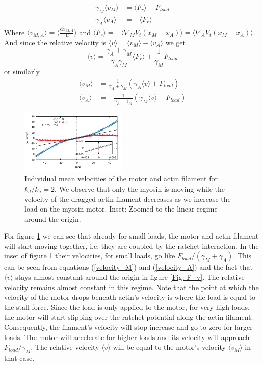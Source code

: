 \documentclass[aps,pre,twocolumn,showpacs,showkeys,a4paper]{revtex4}
\newcommand{\rmd}{{\mathrm d}}
\begin{document}
\begin{align*}
\gamma_M \langle v_M \rangle &= \langle F_r \rangle + F_{load} \\
\gamma_A \langle v_A \rangle &= -\langle F_r \rangle
\end{align*}
Where $\langle v_{M,A} \rangle = \langle \frac{\rmd x_{M,A}}{\rmd t} \rangle$ 
and $\langle F_r \rangle = - \langle \nabla_M V_t(x_M - x_A ) \rangle = \langle \nabla_A V_t(x_M - x_A ) \rangle $. 
And since the relative velocity is $\langle v \rangle = \langle v_{M} \rangle - \langle v_{A} \rangle$ we get
\begin{equation*}
\langle v \rangle = \frac{\gamma_A + \gamma_M}{\gamma_A \gamma_M} \langle F_r \rangle + \frac{1}{\gamma_M} F_{load}
\end{equation*}
or similarly
\begin{align}
\langle v_M \rangle &= \frac{1}{ \gamma_A + \gamma_M } \left( \gamma_A \langle v \rangle + F_{load} \right) \label{velocity_M} \\
\langle v_A \rangle &= -\frac{1}{ \gamma_A + \gamma_M } \left( \gamma_M \langle v \rangle - F_{load} \right)
\label{velocity_A}
\end{align}

\begin{figure}[t]
\centering
\includegraphics[width=0.45\textwidth,height=!]{individual_velocities}
\caption{Individual mean velocities of the motor and actin filament for $k_d/k_a = 2$.
We observe that only the myosin is moving while the velocity of the dragged actin filament decreases as we increase the load on the myosin motor.
Inset: Zoomed to the linear regime around the origin.
}
\label{Fig: ind_v} 
\end{figure}
For figure \ref{Fig: ind_v} we can see that already for small loads, the motor and actin filament will start moving together, i.e. they are coupled by the ratchet interaction. 
In the inset of figure \ref{Fig: ind_v} their velocities, for small loads, go like $F_{load}/(\gamma_M + \gamma_A)$. 
This can be seen from equations (\ref{velocity_M}) and (\ref{velocity_A}) and the fact that $\langle v \rangle$ stays almost constant around the origin in figure \ref{Fig: F_v}. 
The relative velocity remains almost constant in this regime.
Note that the point at which the velocity of the motor drops beneath actin's velocity is where the load is equal to the stall force.
Since the load is only applied to the motor, for very high loads, the motor will start slipping over the ratchet potential along the actin filament. 
Consequently, the filament's velocity will stop increase and go to zero for larger loads. 
The motor will accelerate for higher loads and its velocity will approach $F_{load}/\gamma_M$. 
The relative velocity $\langle v \rangle$ will be equal to the motor's velocity $\langle v_M \rangle$ in that case.
\end{document}
